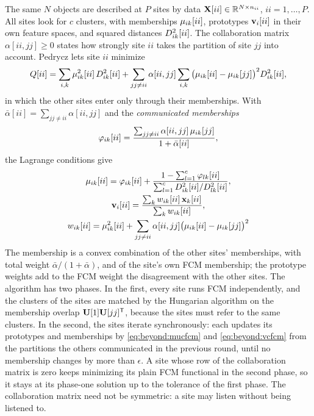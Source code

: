 The same $N$ objects are described at $P$ sites by data $\mathbf{X}[ii]\in\mathbb{R}^{N\times n_{ii}}$, $ii=1,\dots,P$. All sites look for $c$ clusters, with memberships $\mu_{ik}[ii]$, prototypes $\mathbf{v}_i[ii]$ in their own feature spaces, and squared distances $D^2_{ik}[ii]$. The collaboration matrix $\alpha[ii,jj]\ge0$ states how strongly site $ii$ takes the partition of site $jj$ into account. Pedrycz \cite{pedrycz:2002:collaborative} lets site $ii$ minimize
\begin{equation}
  Q[ii]=\sum_{i,k}\mu_{ik}^2[ii]\,D^2_{ik}[ii]+\sum_{jj\ne ii}\alpha[ii,jj]\sum_{i,k}\big(\mu_{ik}[ii]-\mu_{ik}[jj]\big)^2D^2_{ik}[ii],
  \label{eq:beyond:Q}
\end{equation}
in which the other sites enter only through their memberships. With $\bar\alpha[ii]=\sum_{jj\ne ii}\alpha[ii,jj]$ and the \emph{communicated memberships}
\begin{equation}
  \varphi_{ik}[ii]=\frac{\sum_{jj\ne ii}\alpha[ii,jj]\,\mu_{ik}[jj]}{1+\bar\alpha[ii]},
  \label{eq:beyond:phi}
\end{equation}
the Lagrange conditions give
\begin{gather}
  \mu_{ik}[ii]=\varphi_{ik}[ii]+\frac{1-\sum_{l=1}^{c}\varphi_{lk}[ii]}{\sum_{l=1}^{c}D^2_{ik}[ii]/D^2_{lk}[ii]},
  \label{eq:beyond:mucfcm}\\
  \mathbf{v}_i[ii]=\frac{\sum_k w_{ik}[ii]\,\mathbf{x}_k[ii]}{\sum_k w_{ik}[ii]},
  \label{eq:beyond:vcfcm}\\
  w_{ik}[ii]=\mu_{ik}^2[ii]+\sum_{jj\ne ii}\alpha[ii,jj]\big(\mu_{ik}[ii]-\mu_{ik}[jj]\big)^2 \notag
\end{gather}
The membership is a convex combination of the other sites' memberships, with total weight $\bar\alpha/(1+\bar\alpha)$, and of the site's own FCM membership; the prototype weights add to the FCM weight the disagreement with the other sites. The algorithm has two phases. In the first, every site runs FCM independently, and the clusters of the sites are matched by the Hungarian algorithm on the membership overlap $\mathbf{U}[1]\mathbf{U}[jj]^{\mathsf{T}}$, because the sites must refer to the same clusters. In the second, the sites iterate synchronously: each updates its prototypes and memberships by \eqref{eq:beyond:mucfcm} and \eqref{eq:beyond:vcfcm} from the partitions the others communicated in the previous round, until no membership changes by more than $\epsilon$. A site whose row of the collaboration matrix is zero keeps minimizing its plain FCM functional in the second phase, so it stays at its phase-one solution up to the tolerance of the first phase. The collaboration matrix need not be symmetric: a site may listen without being listened to.

